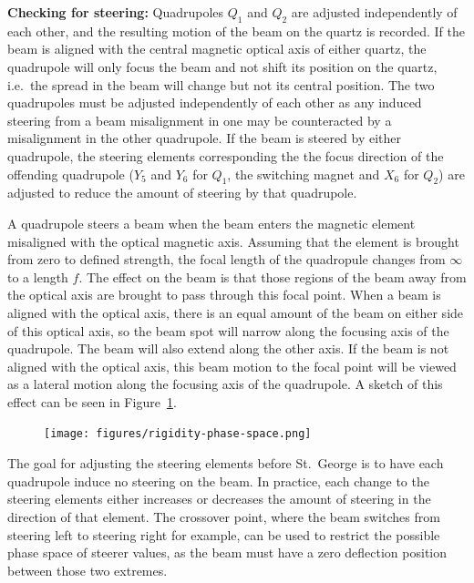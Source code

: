 \textbf{Checking for steering:}
Quadrupoles $Q_1$ and $Q_2$ are adjusted independently of each other,
and the resulting motion of the beam on the quartz is recorded. If the
beam is aligned with the central magnetic optical axis of either quartz,
the quadrupole will only focus the beam and not shift its position on
the quartz, i.e.\ the spread in the beam will change but not its central
position. The two quadrupoles must be adjusted independently of each
other as any induced steering from a beam misalignment in one may be
counteracted by a misalignment in the other quadrupole. If the beam is
steered by either quadrupole, the steering elements corresponding the
the focus direction of the offending quadrupole ($Y_5$ and $Y_6$ for
$Q_1$, the switching magnet and $X_6$ for $Q_2$) are adjusted to reduce
the amount of steering by that quadrupole.

A quadrupole steers a beam when the beam enters the magnetic element
misaligned with the optical magnetic axis. Assuming that the element is
brought from zero to defined strength, the focal length of the
quadropule changes from $\infty$ to a length $f$. The effect on the beam
is that those regions of the beam away from the optical axis are brought
to pass through this focal point. When a beam is aligned with the
optical axis, there is an equal amount of the beam on either side of
this optical axis, so the beam spot will narrow along the focusing axis
of the quadrupole. The beam will also extend along the other axis. If
the beam is not aligned with the optical axis, this beam motion to the
focal point will be viewed as a lateral motion along the focusing axis
of the quadrupole. A sketch of this effect can be seen in
Figure~\ref{fig:steering}.

\begin{figure}[t]
   \begin{center}
       \centerline{\texttt{[image: figures/rigidity-phase-space.png]}}
       \caption[Sketch of quadrupole steering of misaligned beam]{}
       \label{fig:steering}
   \end{center}
\end{figure}

The goal for adjusting the steering elements before St.\ George is to
have each quadrupole induce no steering on the beam. In practice, each
change to the steering elements either increases or decreases the amount
of steering in the direction of that element. The crossover point, where
the beam switches from steering left to steering right for example, can
be used to restrict the possible phase space of steerer values, as the
beam must have a zero deflection position between those two extremes.

